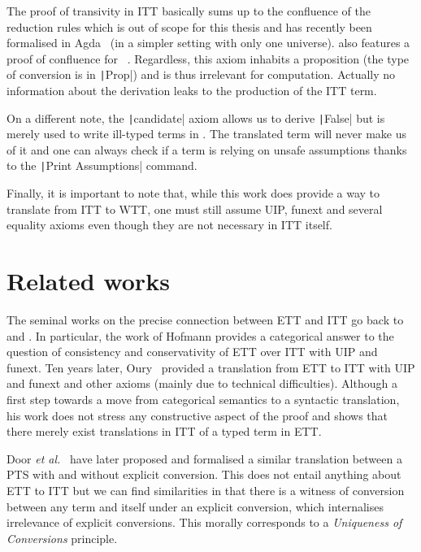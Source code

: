 The proof of transivity in \acrshort{ITT} basically sums up to the confluence of
the reduction rules which is out of scope for this thesis and has
recently been formalised in Agda~ (in a
simpler setting with only one universe).
\MetaCoq also features a proof of confluence for
\Coq~.
Regardless, this axiom inhabits a proposition (the type of conversion is in
\texttt|Prop|) and is thus irrelevant for computation. Actually no
information about the derivation leaks to the production of the \acrshort{ITT}
term.

On a different note, the \texttt|candidate| axiom allows us to derive
\texttt|False| but is merely used to write ill-typed terms in \Coq.
The translated term will never make us of it and one can always check if a
term is relying on unsafe assumptions thanks to the
\texttt|Print Assumptions| command.

Finally, it is important to note that, while this work does provide a
way to translate from \acrshort{ITT} to \acrshort{WTT}, one must still assume
\acrshort{UIP}, \acrshort{funext} and several equality axioms even though they
are not necessary in \acrshort{ITT} itself.

\section{Related works}
\label{sec:related-works}

The seminal works on the precise connection between \acrshort{ETT} and
\acrshort{ITT} go back to  and
.
%
In particular, the work of Hofmann provides a categorical answer to
the question of consistency and conservativity of \acrshort{ETT} over
\acrshort{ITT} with \acrshort{UIP} and \acrshort{funext}.
%
Ten years later, Oury~
provided a translation from \acrshort{ETT} to \acrshort{ITT} with
\acrshort{UIP} and \acrshort{funext} and other axioms (mainly due to
technical difficulties).
%
Although a first step towards a move from categorical semantics to a
syntactic translation, his work does not stress any constructive
aspect of the proof and shows that there merely exist translations in
\acrshort{ITT} of a typed term in \acrshort{ETT}.

Door \emph{et al.}~ have later proposed and
formalised a similar translation between a \acrshort{PTS} with and without
explicit conversion. This does not entail anything about \acrshort{ETT} to
\acrshort{ITT} but we can find similarities in that there is a witness of
conversion between any term and itself under an explicit conversion, which
internalises irrelevance of explicit conversions. This morally corresponds to a
\emph{Uniqueness of Conversions} principle.

